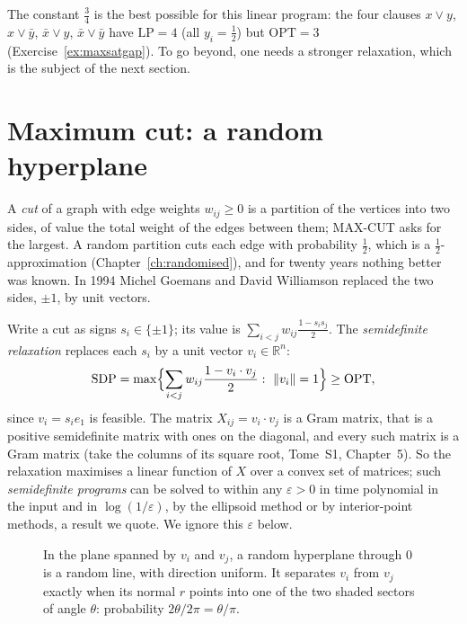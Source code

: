 The constant $\frac34$ is the best possible for this linear program: the four clauses $x\vee y$, $x\vee\bar y$, $\bar x\vee y$, $\bar x\vee\bar y$ have $\mathrm{LP}=4$ (all $y_i=\frac12$) but $\mathrm{OPT}=3$ (Exercise~\ref{ex:maxsatgap}). To go beyond, one needs a stronger relaxation, which is the subject of the next section.

\section{Maximum cut: a random hyperplane}\label{sec:gw}

A \emph{cut} of a graph with edge weights $w_{ij}\ge0$ is a partition of the vertices into two sides, of value the total weight of the edges between them; MAX-CUT asks for the largest. A random partition cuts each edge with probability $\frac12$, which is a $\frac12$-approximation (Chapter~\ref{ch:randomised}), and for twenty years nothing better was known. In 1994 Michel Goemans and David Williamson replaced the two sides, $\pm1$, by unit vectors.

Write a cut as signs $s_i\in\{\pm1\}$; its value is $\sum_{i<j}w_{ij}\frac{1-s_is_j}2$. The \emph{semidefinite relaxation} replaces each $s_i$ by a unit vector $v_i\in\mathbb R^n$:
\[
\mathrm{SDP}=\max\Bigl\{\sum_{i<j}w_{ij}\frac{1-v_i\cdot v_j}2:\ \|v_i\|=1\Bigr\}\ge\mathrm{OPT},
\]
since $v_i=s_ie_1$ is feasible. The matrix $X_{ij}=v_i\cdot v_j$ is a Gram matrix, that is a positive semidefinite matrix with ones on the diagonal, and every such matrix is a Gram matrix (take the columns of its square root, Tome~S1, Chapter~5). So the relaxation maximises a linear function of $X$ over a convex set of matrices; such \emph{semidefinite programs} can be solved to within any $\varepsilon>0$ in time polynomial in the input and in $\log(1/\varepsilon)$, by the ellipsoid method or by interior-point methods, a result we quote. We ignore this $\varepsilon$ below.

\begin{figure}[ht]
\centering
{}
\caption{In the plane spanned by $v_i$ and $v_j$, a random hyperplane through $0$ is a random line, with direction uniform. It separates $v_i$ from $v_j$ exactly when its normal $r$ points into one of the two shaded sectors of angle $\theta$: probability $2\theta/2\pi=\theta/\pi$.}
\label{fig:gw}
\end{figure}

